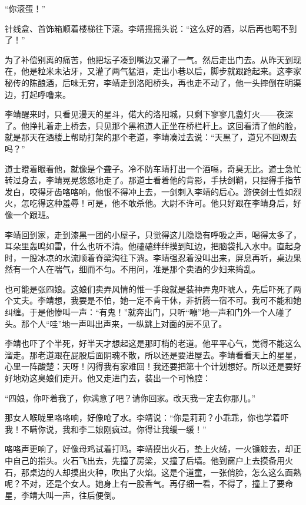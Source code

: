 “你滚蛋！”

针线盒、首饰箱顺着楼梯往下滚。李靖摇摇头说：“这么好的酒，以后再也喝不到了！”

为了补偿别离的痛苦，他把坛子凑到嘴边又灌了一气。然后走出门去。从昨天到现在，他是粒米未沾牙，又灌了两气猛酒，走出小巷以后，脚步就跟跄起来。这李家秘传的陈酿酒，后味无穷，李靖走到洛阳桥头，再也走不动了，他一头摔倒在明渠边，打起呼噜来。

李靖醒来时，只看见漫天的星斗，偌大的洛阳城，只剩下寥寥几盏灯火——夜深了。他挣扎着走上桥去，只见那个黑袍道人正坐在桥栏杆上。这回看清了他的脸，就是那天在酒楼上帮助打架的那个老道，李靖凑过去说：“天黑了，道兄不回观去吗？”

道士瞪着眼看他，就像是个聋子。冷不防车靖打出一个酒嗝，奇臭无比。道士急忙转过身去，李靖晃晃悠悠地走了。那道士看着他的背影，手扶剑鞘，只捏得手指节发白，咬得牙齿咯咯响，他恨不得冲上去，一剑刺入李靖的后心。游侠剑士性如烈火，怎吃得这种羞辱！可是，他不敢杀他。大尉不许可。他只好跟在李靖身后，好像一个跟班。

李靖回到家，走到漆黑一团的小屋子，只觉得这儿隐隐有呼吸之声，喝得太多了，耳朵里轰鸣如雷，什么也听不清。他磕磕绊绊摸到缸边，把脑袋扎入水中。直起身时，一股冰凉的水流顺着脊梁沟往下淌。李靖强忍着没叫出来，屏息再听，桌边果然有一个人在喘气，细而不匀。不用问，准是那个卖酒的少妇来捣乱。

也可能是张四娘。这娘们卖弄风情的惟一手段就是装神弄鬼吓唬人，先后吓死了两个丈夫。李靖想，我要是不怕，她一定不肯干休，非折腾一宿不可。我可不能和她纠缠。于是他惨叫一声：“有鬼！”就奔出门，只听“嘣”地一声和门外一个人碰了头。那个人“哇”地一声叫出声来，一纵跳上对面的房不见了。

李靖也吓了个半死，好半天才想起这是那盯梢的老道。他平平心气，觉得不能这么溜走。那老道跟在屁股后面阴魂不散，所以还是要进屋去。李靖看看天上的星星，心里一阵酸楚：天呀！闪得我有家难回！我还要把第十个计划想好。所以还是要好好地劝这臭娘们走开。他又走进门去，装出一个可怜腔：

“四娘，你吓着我了，你满意了吧？请你回家。改天我一定去你那儿。”

那女人喉咙里咯咯响，好像呛了水。李靖说：“你是莉莉？小乖乖，你也学着吓我！不瞒你说，我和李二娘刚疯过。你得让我缓一缓！”

咯咯声更响了，好像母鸡试着打鸣。李靖摸出火石，垫上火绒，一火镰敲去，却正中自己的指头。火石飞出去，先撞了房梁，又撞了后墙。他到窗户上去摸备用火石，那桌边的人却摸出火种，吹出了火焰。这是个道童，一张俏脸，怎么这么面熟呢？不对，还是个女人。她身上有一股香气。再仔细一看，不得了，撞上了要命星，李靖大叫一声，往后便倒。

